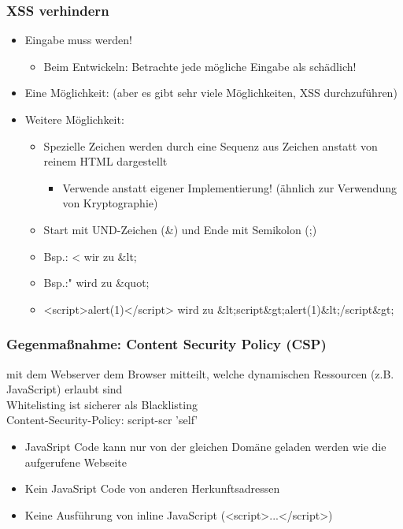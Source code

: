 \subsubsection*{XSS verhindern}
\begin{itemize}
    \item Eingabe muss  werden!
    \begin{itemize}
        \item Beim Entwickeln: Betrachte jede mögliche Eingabe als schädlich!
    \end{itemize}
    \item Eine Möglichkeit:  (aber es gibt sehr viele Möglichkeiten, XSS durchzuführen)
    \item Weitere Möglichkeit: 
    \begin{itemize}
        \item Spezielle Zeichen werden durch eine Sequenz aus Zeichen anstatt von reinem HTML dargestellt 
        \begin{itemize}
            \item {} Verwende  anstatt eigener Implementierung! (ähnlich zur Verwendung von Kryptographie)
        \end{itemize}
        \item Start mit UND-Zeichen (\&) und Ende mit Semikolon (;)
        \item Bsp.: < wir zu \&lt;
        \item Bsp.:" wird zu \&quot;
        \item <script>alert(1)</script> wird zu \&lt;script\&gt;alert(1)\&lt;/script\&gt;
    \end{itemize}
\end{itemize}
\subsubsection*{Gegenmaßnahme: Content Security Policy (CSP)}
 mit dem Webserver dem Browser mitteilt, welche dynamischen Ressourcen (z.B. JavaScript) erlaubt sind\\
 Whitelisting ist sicherer als Blacklisting\\
 Content-Security-Policy: script-scr 'self'
\begin{itemize}
    \item JavaSript Code kann nur von der gleichen Domäne geladen werden wie die aufgerufene Webseite
    \item Kein JavaSript Code von anderen Herkunftsadressen
    \item Keine Ausführung von inline JavaScript (<script>...</script>)
\end{itemize}
\clearpage
